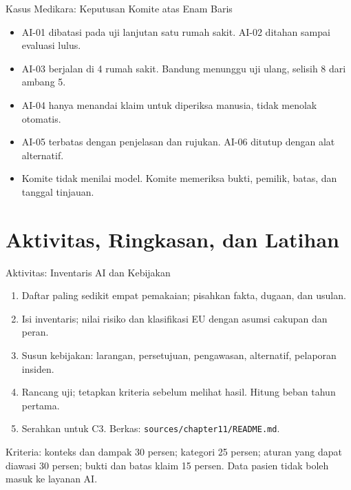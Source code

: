 \documentclass[aspectratio=169, table, 12pt]{beamer}
\begin{document}
\begin{frame}{{\Large Kasus Medikara: Keputusan Komite atas Enam Baris}}
  \vspace{6pt}
  \small
  \begin{itemize}
    \item AI-01 dibatasi pada uji lanjutan satu rumah sakit. AI-02 ditahan sampai evaluasi lulus.
    \item AI-03 berjalan di 4 rumah sakit. Bandung menunggu uji ulang, selisih 8 dari ambang 5.
    \item AI-04 hanya menandai klaim untuk diperiksa manusia, tidak menolak otomatis.
    \item AI-05 terbatas dengan penjelasan dan rujukan. AI-06 ditutup dengan alat alternatif.
    \item Komite tidak menilai model. Komite memeriksa bukti, pemilik, batas, dan tanggal tinjauan.
  \end{itemize}
\end{frame}

\section{Aktivitas, Ringkasan, dan Latihan}

\begin{frame}{{\Large Aktivitas: Inventaris AI dan Kebijakan}}
  \vspace{4pt}
  \small
  \begin{enumerate}
    \item Daftar paling sedikit empat pemakaian; pisahkan fakta, dugaan, dan usulan.
    \item Isi inventaris; nilai risiko dan klasifikasi EU dengan asumsi cakupan dan peran.
    \item Susun kebijakan: larangan, persetujuan, pengawasan, alternatif, pelaporan insiden.
    \item Rancang uji; tetapkan kriteria sebelum melihat hasil. Hitung beban tahun pertama.
    \item Serahkan untuk C3. Berkas: \texttt{sources/chapter11/README.md}.
  \end{enumerate}

  \vspace{2pt}
  \footnotesize Kriteria: konteks dan dampak 30 persen; kategori 25 persen; aturan yang dapat
  diawasi 30 persen; bukti dan batas klaim 15 persen. Data pasien tidak boleh masuk ke layanan AI.
\end{frame}
\end{document}
